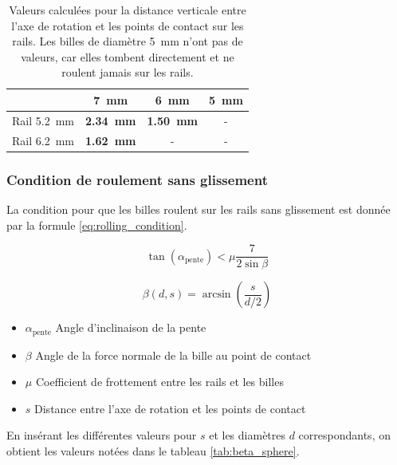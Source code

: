 \begin{table}[htbp]
    \centering
    \begin{tabular}{|c|c|c|c|}
        \hline
         & \SI{7}{\mm} & \SI{6}{\mm} & \SI{5}{\mm} \\
        \hline
        Rail \SI{5.2}{\mm}& \textbf{\SI{2.34}{\mm}} & \textbf{\SI{1.50}{\mm}} & - \\
        \hline
        Rail \SI{6.2}{\mm}& \textbf{\SI{1.62}{\mm}} & - & - \\
        \hline
    \end{tabular}
    \caption{Valeurs calculées pour la distance verticale entre l'axe de rotation et les points de contact sur les rails. Les billes de diamètre \SI{5}{\mm} n'ont pas de valeurs, car elles tombent directement et ne roulent jamais sur les rails.}
    \label{tab:distance_rails}
\end{table}

\subsubsection{Condition de roulement sans glissement}
La condition pour que les billes roulent sur les rails sans glissement est donnée par la formule \ref{eq:rolling_condition}.

\begin{equation}
    \tan(\alpha_{\text{pente}}) < \mu \frac{7}{2\sin{\beta}}
    \label{eq:rolling_condition}
\end{equation}

\[\beta(d,s) = \arcsin\left(\frac{s}{d/2}\right)\]


\begin{itemize}[label={}, noitemsep]
	\item $\alpha_{\text{pente}}$ \tabto{\tabtoX} Angle d'inclinaison de la pente
	\item $\beta$ \tabto{\tabtoX} Angle de la force normale de la bille au point de contact
	\item $\mu$ \tabto{\tabtoX} Coefficient de frottement entre les rails et les billes
	\item $s$ \tabto{\tabtoX} Distance entre l'axe de rotation et les points de contact
\end{itemize}

En insérant les différentes valeurs pour $s$ et les diamètres $d$ correspondants, on obtient les valeurs notées dans le tableau \ref{tab:beta_sphere}.

